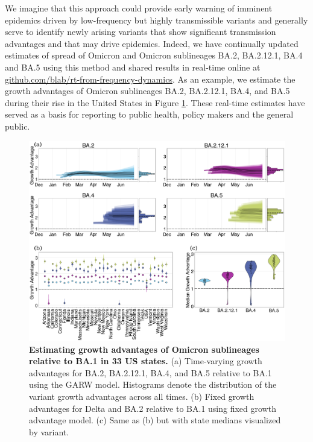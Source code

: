 \documentclass[11pt,oneside,letterpaper]{article}
\begin{document}
We imagine that this approach could provide early warning of imminent epidemics driven by low-frequency but highly transmissible variants and generally serve to identify newly arising variants that show significant transmission advantages and that may drive epidemics.
Indeed, we have continually updated estimates of spread of Omicron and Omicron sublineages BA.2, BA.2.12.1, BA.4 and BA.5 using this method and shared results in real-time online at \href{https://github.com/blab/rt-from-frequency-dynamics/}{github.com/blab/rt-from-frequency-dynamics}.
As an example, we estimate the growth advantages of Omicron sublineages BA.2, BA.2.12.1, BA.4, and BA.5 during their rise in the United States in Figure \ref{fig:omicron_growth_advantages}.
These real-time estimates have served as a basis for reporting to public health, policy makers and the general public.

\begin{figure}[h!]
  \centering
  \includegraphics[width=\linewidth]{figs/omicron_growth_advantage.png}
  \caption{\textbf{Estimating growth advantages of Omicron sublineages relative to BA.1 in 33 US states.}
    (a) Time-varying growth advantages for BA.2, BA.2.12.1, BA.4, and BA.5 relative to BA.1 using the GARW model.
    Histograms denote the distribution of the variant growth advantages across all times.
    (b) Fixed growth advantages for Delta and BA.2 relative to BA.1 using fixed growth advantage model.
    (c) Same as (b) but with state medians visualized by variant.
  }
  \label{fig:omicron_growth_advantages}
\end{figure}
\end{document}
